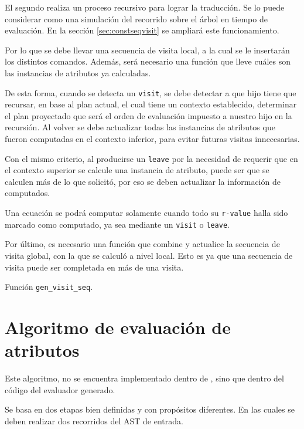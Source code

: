 El segundo realiza un proceso recursivo para lograr la traducción. Se lo puede considerar como una simulación del recorrido sobre el árbol en tiempo de evaluación. En la sección \ref{sec:constseqvisit} se ampliará este funcionamiento.

Por lo que se debe llevar una secuencia de visita local, a la cual se le insertarán los distintos comandos. Además, será necesario una función que lleve cuáles son las instancias de atributos ya calculadas.

De esta forma, cuando se detecta un \texttt{visit}, se debe detectar a que hijo tiene que recursar, en base al plan actual, el cual tiene un contexto establecido, determinar el plan proyectado que será el orden de evaluación impuesto a nuestro hijo en la recursión. Al volver se debe actualizar todas las instancias de atributos que fueron computadas en el contexto inferior, para evitar futuras visitas innecesarias.

Con el mismo criterio, al producirse un \texttt{leave} por la necesidad de requerir que en el contexto superior se calcule una instancia de atributo, puede ser que se calculen más de lo que solicitó, por eso se deben actualizar la información de computados.

Una ecuación se podrá computar solamente cuando todo su \texttt{r-value} halla sido marcado como computado, ya sea mediante un \texttt{visit} o \texttt{leave}.

Por último, es necesario una función que combine y actualice la secuencia de visita global, con la que se calculó a nivel local. Esto es ya que una secuencia de visita puede ser completada en más de una visita.

\begin{algorithm}[H]

\caption{Función \texttt{gen\_visit\_seq}.}
\end{algorithm}

\section{Algoritmo de evaluación de atributos}
\label{sec:algevalattr}

Este algoritmo, no se encuentra implementado dentro de \maggen, sino que dentro del código del evaluador generado.

Se basa en dos etapas bien definidas y con propósitos diferentes. En las cuales se deben realizar dos recorridos del AST de entrada.

